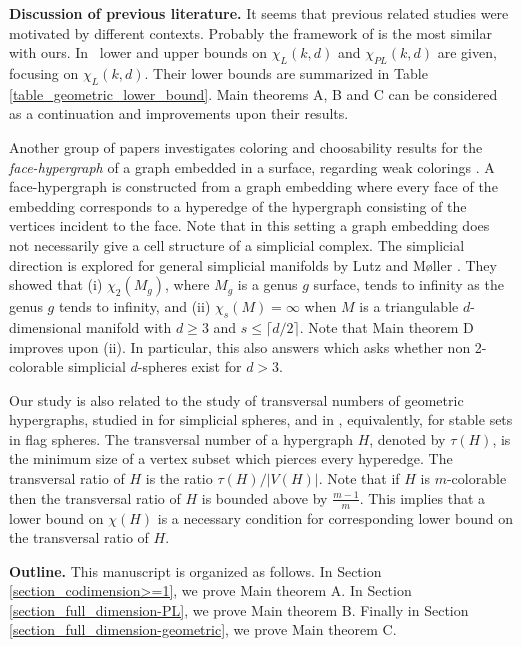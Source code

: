 \documentclass{article}
\theoremstyle{definition}
\begin{document}
\textbf{Discussion of previous literature.}
It seems that previous related studies were motivated by different contexts. Probably the framework of \cite{coloring_d-embeddable} is the most similar with ours. In~\cite{coloring_d-embeddable}
lower and upper bounds on 
$\chi_L(k,d)$ and $\chi_{PL}(k,d)$ are given, 
focusing on $\chi_L(k,d)$. 
Their lower bounds are summarized in Table \ref{table_geometric_lower_bound}. Main theorems A, B and C can be considered as a continuation and improvements upon their results.

Another group of papers investigates coloring and choosability results for the \textit{face-hypergraph} of a graph embedded in a surface, regarding weak colorings \cite{coloring_surface_jctb, coloring_surface_answer, choosability_genus, Thomassen_list_coloring_2-sphere}. A face-hypergraph is constructed from a graph embedding where every face of the embedding corresponds to a hyperedge of the hypergraph consisting of the vertices incident to the face. Note that in this setting a graph embedding does not necessarily give a cell structure of a simplicial complex.
The simplicial direction is explored for general simplicial manifolds by Lutz and M\o ller \cite{coloring_surface_lutz}. They showed that (i) $\chi_2(M_g)$, where $M_g$ is a genus $g$ surface, tends to infinity as the genus $g$ tends to infinity, and (ii) $\chi_s(M)=\infty$ when $M$ is a triangulable $d$-dimensional manifold with $d\geq 3$ and $s \leq \lceil d/2\rceil$. Note that Main theorem D 
improves upon (ii). In particular, this also answers \cite[Question 6]{transversals_spheres_joseph_michael} which asks whether non 2-colorable simplicial $d$-spheres exist for $d>3$.

Our study is also related to the study of transversal numbers of geometric hypergraphs, 
studied in 
\cite{transversals_spheres_joseph_michael, novik_transversal_open_problem, cho2023transversal, novik2024transversalnumberssimplicialpolytopes} for simplicial spheres, and in \cite{nevo_stable_flag}, equivalently, for stable sets in flag spheres.
 The transversal number of a hypergraph $H$, denoted by $\tau(H)$, is the minimum size of a vertex subset which pierces every hyperedge. The transversal ratio of $H$ is the ratio $\tau(H)/|V(H)|$. Note that if $H$ is $m$-colorable then the transversal ratio of $H$ is bounded above by $\frac{m-1}{m}$. This implies that a lower bound on $\chi(H)$ is a necessary condition for corresponding lower bound on the transversal ratio of $H$.
 

\medskip 
\textbf{Outline.}
This manuscript is organized as follows. In Section \ref{section_codimension>=1}, we prove Main theorem A. In Section \ref{section_full_dimension-PL}, we prove Main theorem B. Finally in Section \ref{section_full_dimension-geometric}, we prove Main theorem C.
\end{document}
